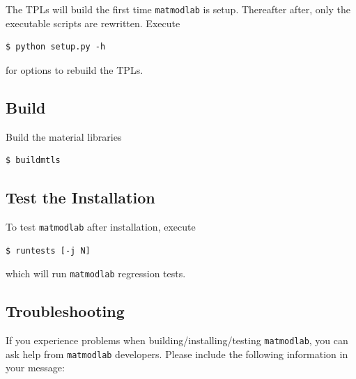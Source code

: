 \documentclass[12pt,report,strict]{SANDreport/SANDreport}
\newcommand{\mml}{\texttt{matmodlab}}
\begin{document}
The TPLs will build the first time \mml{} is setup.
Thereafter after, only the executable scripts are rewritten.  Execute

\begin{verbatim}
$ python setup.py -h
\end{verbatim}
for options to rebuild the TPLs.

\subsection{Build}
\label{sec:bld}
Build the material libraries
\begin{verbatim}
$ buildmtls
\end{verbatim}

\subsection{Test the Installation}
\label{sec:test-install}
To test \mml{} after installation, execute

\begin{verbatim}
$ runtests [-j N]
\end{verbatim}
%
which will run \mml{} regression tests.

\subsection{Troubleshooting}
\label{sec:trouble}
If you experience problems when building/installing/testing \mml{}, you can
ask help from \mml{} developers. Please include the following information
in your message:
\end{document}

